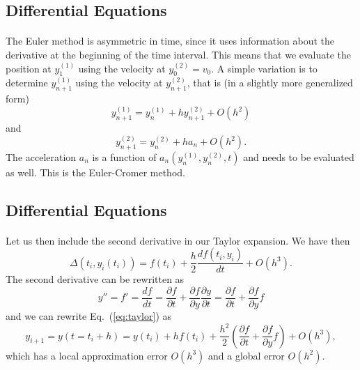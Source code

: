 \documentclass[%
oneside,                 %
final,                   %
10pt]{article}
\begin{document}
\subsection{Differential Equations}

\paragraph{}
The Euler method is asymmetric in time, since it uses information about the derivative at the beginning
of the time interval. This means that we evaluate the position at $y^{(1)}_1$ using the velocity
at $y^{(2)}_0=v_0$. A simple variation is to determine $y^{(1)}_{n+1}$ using the velocity at
$y^{(2)}_{n+1}$, that is (in a slightly more generalized form)
\begin{equation} 
   y^{(1)}_{n+1}=y^{(1)}_{n}+h y^{(2)}_{n+1}+O(h^2)
\end{equation}
and 
\begin{equation}
   y^{(2)}_{n+1}=y^{(2)}_{n}+h a_{n}+O(h^2).
\end{equation}
The acceleration $a_n$ is a function of $a_n(y^{(1)}_{n}, y^{(2)}_{n},t)$ and needs to be evaluated
as well. This is the Euler-Cromer method.




\subsection{Differential Equations}

\paragraph{}
Let us then include the second derivative in our Taylor expansion. 
We have then
\begin{equation}
 \Delta(t_i,y_i(t_i))=f(t_i)+\frac{h}{2}\frac{df(t_i,y_i)}{dt}+O(h^3).
\end{equation}
The second derivative can be rewritten as
\begin{equation}
  y''=f'=\frac{df}{dt}=\frac{\partial f}{\partial t}+\frac{\partial f}{\partial y}\frac{\partial y}{\partial t}=\frac{\partial f}{\partial t}+\frac{\partial f}{\partial y}f \label{eq:derivatives}
\end{equation}
and we can rewrite Eq.\ (\ref{eq:taylor}) as 
\begin{equation}
     y_{i+1}=y(t=t_i+h)=y(t_i) +hf(t_i)+
     \frac{h^2}{2}\left(\frac{\partial f}{\partial t}+\frac{\partial f}{\partial y}f\right) + O(h^{3  }),
\end{equation}
which has a local approximation error $O(h^{3  })$ and a global
error $O(h^{2})$.
\end{document}
